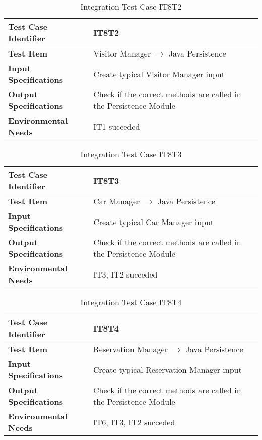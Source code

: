 \begin{table}[htbp]
\begin{center}
\renewcommand{\arraystretch}{1.5}
\begin{tabular}{l|p{}}
\hline
\textbf{Test Case Identifier} & IT8T2\\
\hline
\textbf{Test Item} & Visitor Manager $\rightarrow$ Java Persistence\\
\hline
\textbf{Input Specifications} & Create typical Visitor Manager input \\
\hline
\textbf{Output Specifications} & Check if the correct methods are called in the Persistence Module \\
\hline
\textbf{Environmental Needs} & IT1 succeded\\
\hline
\end{tabular}
\caption{Integration Test Case IT8T2}
\end{center}
\end{table}

\vspace{10pt}
\begin{table}[htbp]
\begin{center}
\renewcommand{\arraystretch}{1.5}
\begin{tabular}{l|p{}}
\hline
\textbf{Test Case Identifier} & IT8T3\\
\hline
\textbf{Test Item} & Car Manager $\rightarrow$ Java Persistence\\
\hline
\textbf{Input Specifications} & Create typical Car Manager input \\
\hline
\textbf{Output Specifications} & Check if the correct methods are called in the Persistence Module \\
\hline
\textbf{Environmental Needs} & IT3, IT2 succeded\\
\hline
\end{tabular}
\caption{Integration Test Case IT8T3}
\end{center}
\end{table}
\clearpage

\begin{table}[htbp]
\begin{center}
\renewcommand{\arraystretch}{1.5}
\begin{tabular}{l|p{}}
\hline
\textbf{Test Case Identifier} & IT8T4\\
\hline
\textbf{Test Item} & Reservation Manager $\rightarrow$ Java Persistence\\
\hline
\textbf{Input Specifications} & Create typical Reservation Manager input \\
\hline
\textbf{Output Specifications} & Check if the correct methods are called in the Persistence Module \\
\hline
\textbf{Environmental Needs} & IT6, IT3, IT2 succeded\\
\hline
\end{tabular}
\caption{Integration Test Case IT8T4}
\end{center}
\end{table}

